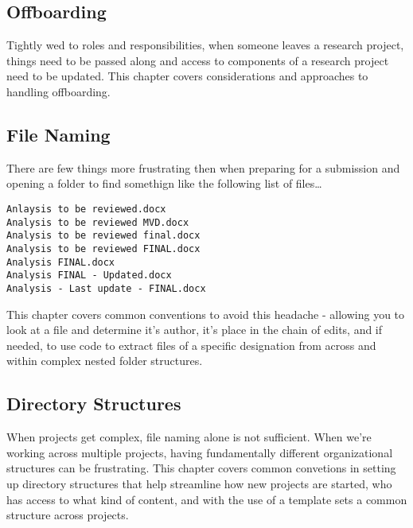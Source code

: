\documentclass[
]{book}
\begin{document}
\hypertarget{offboarding}{%
\subsection*{Offboarding}\label{offboarding}}

Tightly wed to roles and responsibilities, when someone leaves a research project, things need to be passed along and access to components of a research project need to be updated. This chapter covers considerations and approaches to handling offboarding.

\hypertarget{file-naming}{%
\subsection*{File Naming}\label{file-naming}}

There are few things more frustrating then when preparing for a submission and opening a folder to find somethign like the following list of files\ldots{}

\begin{verbatim}
Anlaysis to be reviewed.docx
Analysis to be reviewed MVD.docx
Analysis to be reviewed final.docx
Analysis to be reviewed FINAL.docx
Analysis FINAL.docx
Analysis FINAL - Updated.docx
Analysis - Last update - FINAL.docx
\end{verbatim}

This chapter covers common conventions to avoid this headache - allowing you to look at a file and determine it's author, it's place in the chain of edits, and if needed, to use code to extract files of a specific designation from across and within complex nested folder structures.

\hypertarget{directory-structures}{%
\subsection*{Directory Structures}\label{directory-structures}}

When projects get complex, file naming alone is not sufficient. When we're working across multiple projects, having fundamentally different organizational structures can be frustrating. This chapter covers common convetions in setting up directory structures that help streamline how new projects are started, who has access to what kind of content, and with the use of a template sets a common structure across projects.
\end{document}
